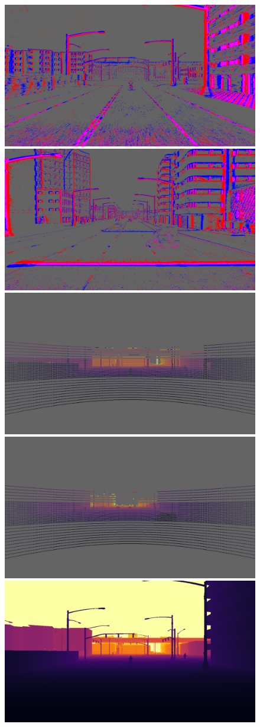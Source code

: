 \begin{figure}
  \centering
  \includegraphics[width=0.475\linewidth]{mainmatter/figures/c_depth_transf/sled_dense_cmp_additional/data_and_gt/evts004386_lightgray_fixed.png}
  \includegraphics[width=0.475\linewidth]{mainmatter/figures/c_depth_transf/sled_dense_cmp_additional/data_and_gt/evts005176_lightgray_fixed.png}\\
  \includegraphics[width=0.475\linewidth]{mainmatter/figures/c_depth_transf/sled_dense_cmp_additional/data_and_gt/lidar004386_lightgray_fixed.png}
  \includegraphics[width=0.475\linewidth]{mainmatter/figures/c_depth_transf/sled_dense_cmp_additional/data_and_gt/lidar005176_lightgray_fixed.png}\\
  \includegraphics[width=0.475\linewidth]{mainmatter/figures/c_depth_transf/sled_dense_cmp_additional/data_and_gt/gtprev004386.png}

\end{figure}
